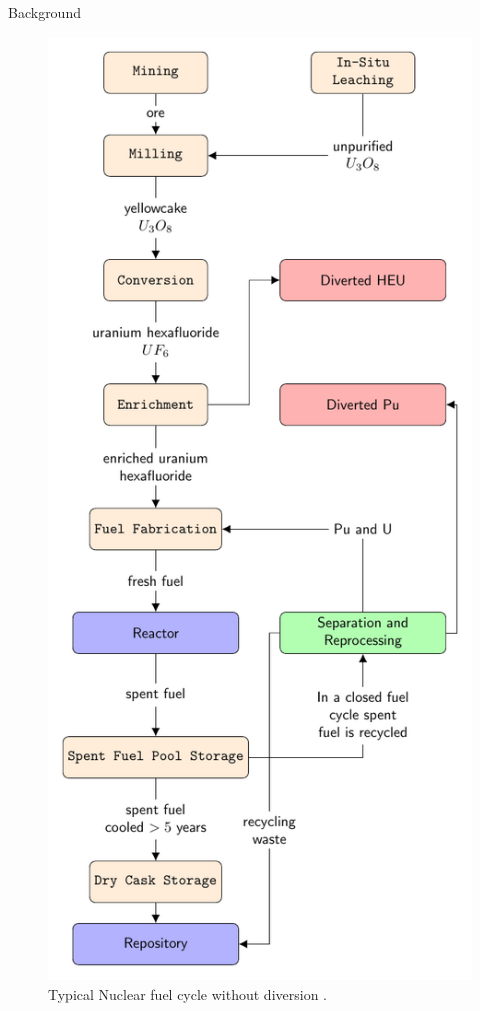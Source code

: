 \documentclass[final]{beamer}
\newlength{\onecolwid}
\newlength{\threecolwid}
\begin{document}
\begin{frame}[t]
\begin{columns}[t,totalwidth=\threecolwid]
\begin{column}{\onecolwid}
\begin{block}{Background}

\begin{figure}
	\includegraphics[width=0.75\linewidth]{fc-diagram.pdf}
	\caption{Typical Nuclear fuel cycle without diversion \cite{huff_2018}.}
\end{figure}

\end{block}



\end{column}
\end{columns}
\end{frame}
\end{document}
